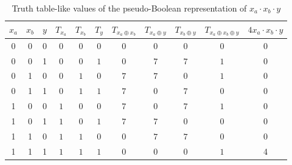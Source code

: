 \begin{table*}[t]
  \begin{minipage}{\textwidth}
    \begin{center}
      \scalebox{1.0} {
        \begin{tabular}{c|c|c|c|c|c|c|c|c|c|c}
          $x_a$ & $x_b$ & $y$ & $T_{x_a}$ & $T_{x_b}$ & $T_{y}$ & $T_{x_a \oplus x_b}$ & $T_{x_a \oplus y}$ & $T_{x_b \oplus y}$ & $T_{x_a \oplus x_b \oplus y}$ & $4x_a \cdot x_b \cdot y$\\\hline
          0     & 0     & 0   & 0         & 0         & 0       & 0                    & 0                  & 0                  & 0                             & 0            \\\hline
          0     & 0     & 1   & 0         & 0         & $1$   & 0                    & $7$             & $7$
                       & $1$                         & 0            \\\hline
          0     & 1     & 0   & 0         & $1$     & 0       & $7$               & $7$             & 0                  & $1$                         & 0            \\\hline
          0     & 1     & 1   & 0         & $1$     & $1$   & $7$               & 0                  & $7$             & 0                             & 0            \\\hline
          1     & 0     & 0   & $1$     & 0         & 0       & $7$               & 0                  & $7$             & $1$                         & 0            \\\hline
          1     & 0     & 1   & $1$     & 0         & $1$   & $7$               & $7$             & 0                  & 0                             & 0            \\\hline
          1     & 1     & 0   & $1$     & $1$     & 0       & 0                    & $7$             & $7$             & 0                             & 0            \\\hline
          1     & 1     & 1   & $1$     & $1$     & $1$   & 0                    & 0                  & 0                  & $1$                         & 4            \\\hline
        \end{tabular}
      }
      \caption{Truth table-like values of the pseudo-Boolean representation of $x_a \cdot x_b \cdot y$}
      \label{table-pseudo-toff}
    \end{center}
  \end{minipage}
  
\end{table*}

